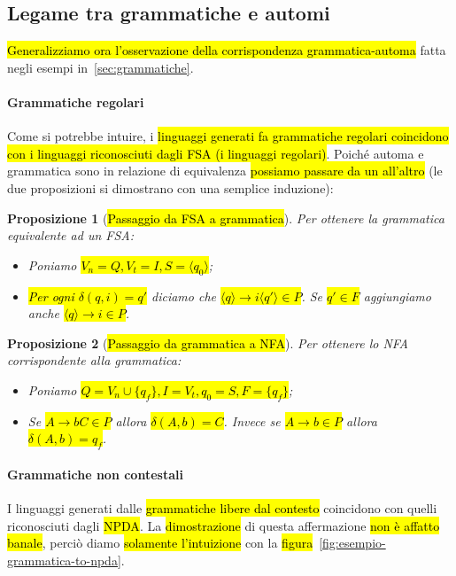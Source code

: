 \documentclass[a4paper,11pt,twoside]{article}
\theoremstyle{plain}
\newtheorem{prop}{Proposizione}[section]
\theoremstyle{definition}
\theoremstyle{remark}
\begin{document}
\subsection{Legame tra grammatiche e automi}\label{sec:gramamtiche-automi}

\hl{Generalizziamo ora l'osservazione della corrispondenza grammatica-automa}
fatta negli esempi in~\ref{sec:grammatiche}.

\paragraph{Grammatiche regolari} Come si potrebbe intuire, i \hl{linguaggi
generati fa grammatiche regolari coincidono con i linguaggi riconosciuti dagli
FSA (i linguaggi regolari)}. Poiché automa e grammatica sono in relazione di
equivalenza \hl{possiamo passare da un all'altro} (le due proposizioni si
dimostrano con una semplice induzione):

\begin{prop}[\hl{Passaggio da FSA a grammatica}]
  Per ottenere la grammatica equivalente ad un FSA\@:

  \begin{itemize}
    \item Poniamo \hl{$V_n = Q, V_t = I, S = \langle q_0 \rangle$};
    \item \hl{Per ogni $\delta(q, i) = q'$} diciamo che
      \hl{$\langle q \rangle \to i \langle q' \rangle \in P$}. Se
      \hl{$q' \in F$} aggiungiamo anche \hl{$\langle q \rangle \to i \in P$}.
  \end{itemize}
\end{prop}

\begin{prop}[\hl{Passaggio da grammatica a NFA}]
  Per ottenere lo NFA corrispondente alla grammatica:

  \begin{itemize}
    \item Poniamo \hl{$Q = V_n \cup \{q_f\}, I = V_t, q_0 = S, F = \{q_f\}$};
    \item Se \hl{$A \to bC \in P$} allora \hl{$\delta(A,b) = C$}. Invece se
      \hl{$A \to b \in P$} allora \hl{$\delta(A, b) = q_f$}.
  \end{itemize}
\end{prop}

\paragraph{Grammatiche non contestali} I linguaggi generati dalle
\hl{grammatiche libere dal contesto} coincidono con quelli riconosciuti dagli
\hl{NPDA}\@. La \hl{dimostrazione} di questa affermazione \hl{non è affatto
banale}, perciò diamo \hl{solamente l'intuizione} con la
\hl{figura}~\ref{fig:esempio-grammatica-to-npda}.
\end{document}
